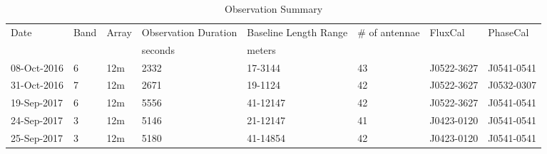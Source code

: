 
\begin{table*}[htp]
\centering
\caption{Observation Summary}
\begin{tabular}{llllllll}
\label{tab:observations}
Date & Band & Array & Observation Duration &  Baseline Length Range  & \# of antennae & FluxCal & PhaseCal\\
     &      &       & seconds              & meters                    &              &         &         \\
\hline
08-Oct-2016 & 6 & 12m & 2332 & 17-3144 & 43 & J0522-3627 & J0541-0541 \\
31-Oct-2016 & 7 & 12m & 2671 & 19-1124 & 42 & J0522-3627 & J0532-0307 \\
19-Sep-2017 & 6 & 12m & 5556 & 41-12147 & 42 & J0522-3627 & J0541-0541 \\
24-Sep-2017 & 3 & 12m & 5146 & 21-12147 & 41 & J0423-0120 & J0541-0541 \\
25-Sep-2017 & 3 & 12m & 5180 & 41-14854 & 42 & J0423-0120 & J0541-0541 \\
\hline
\end{tabular}
\end{table*}

